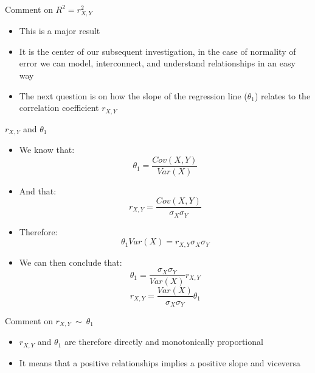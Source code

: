 \documentclass{beamer}
\begin{document}

\begin{frame}
{\centerline{Comment on $R^2 = r_{X,Y}^2$ }}
\begin{itemize}
\item This is a major result\\
\item It is the center of our subsequent investigation, in the case of normality of error we can model, interconnect, and understand relationships in an easy way\\
\item The next question is on how the slope of the regression line ($\theta_1$) relates to the correlation coefficient $r_{X,Y}$

\end{itemize}

\end{frame}

\begin{frame}
{\centerline{$ r_{X,Y} $ and $\theta_1$}}
\begin{itemize}
\item We know that:
$$ \theta_1  = \frac { Cov(X,Y)} { Var(X) } $$
\item And that:
$$r_{X,Y} = \frac{Cov(X,Y)}{\sigma_X\sigma_Y}$$
\item Therefore:
$$ \theta_1  Var(X) = r_{X,Y}  \sigma_X\sigma_Y $$
\item We can then conclude that:
$$ \theta_1  = \frac{\sigma_X\sigma_Y}{Var(X)} r_{X,Y}   $$
$$ r_{X,Y}   = \frac{Var(X)}{\sigma_X\sigma_Y} \theta_1  $$

\end{itemize}

\end{frame}


\begin{frame}
{\centerline{Comment on $ r_{X,Y} ~ \sim ~ \theta_1$}}
\begin{itemize}
\item $ r_{X,Y} $ and $\theta_1$ are therefore directly and monotonically proportional
\item It means that a positive relationships implies a positive slope and viceversa
\end{itemize}

\end{frame}
\end{document}
